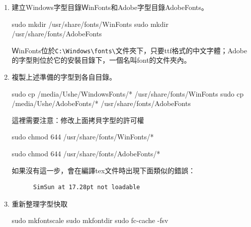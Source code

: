 \documentclass[]{book}
\newenvironment{Shaded}{\begin{snugshade}}{\end{snugshade}}
\newcommand{\FunctionTok}[1]{\textcolor[rgb]{0.00,0.00,0.00}{#1}}
\newcommand{\NormalTok}[1]{#1}
\theoremstyle{definition}
\theoremstyle{definition}
\theoremstyle{definition}
\theoremstyle{remark}
\begin{document}
\begin{enumerate}
\def\labelenumi{\arabic{enumi}.}
\item
  建立Windows字型目錄ＷinFonts和Adobe字型目錄AdobeFonts。

\begin{Shaded}
\begin{Highlighting}[]
 \FunctionTok{sudo}\NormalTok{ mkdir /usr/share/fonts/WinFonts}
 \FunctionTok{sudo}\NormalTok{ mkdir /usr/share/fonts/AdobeFonts}
\end{Highlighting}
\end{Shaded}

  ＷinFonts位於\texttt{C:\textbackslash{}Windows\textbackslash{}fonts\textbackslash{}}文件夾下，只要ttf格式的中文字體；Adobe的字型則位於它的安裝目錄下，一個名叫font的文件夾內。
\item
  複製上述準備的字型到各自目錄。

\begin{Shaded}
\begin{Highlighting}[]
 \FunctionTok{sudo}\NormalTok{ cp /media/Ushe/WindowsFonts/* /usr/share/fonts/WinFonts}
 \FunctionTok{sudo}\NormalTok{ cp /media/Ushe/AdobeFonts/* /usr/share/fonts/AdobeFonts}
\end{Highlighting}
\end{Shaded}

  這裡需要注意：修改上面拷貝字型的許可權

\begin{Shaded}
\begin{Highlighting}[]
          \FunctionTok{sudo}\NormalTok{ chmod 644 /usr/share/fonts/WinFonts/*}

          \FunctionTok{sudo}\NormalTok{ chmod 644 /usr/share/fonts/AdobeFonts/*}
\end{Highlighting}
\end{Shaded}

  如果沒有這一步，會在編譯tex文件時出現下面類似的錯誤：

\begin{verbatim}
      SimSun at 17.28pt not loadable
\end{verbatim}
\item
  重新整理字型快取

\begin{Shaded}
\begin{Highlighting}[]
\FunctionTok{sudo}\NormalTok{  mkfontscale}
\FunctionTok{sudo}\NormalTok{  mkfontdir}
\FunctionTok{sudo}\NormalTok{  fc-cache -fsv}
\end{Highlighting}
\end{Shaded}


\end{enumerate}
\end{document}
